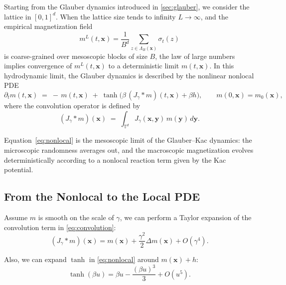 \documentclass[11pt,a4paper]{article}
\begin{document}
Starting from the Glauber dynamics introduced in \cref{sec:glauber}, we consider the lattice in $[0,1]^d$. When the lattice size tends to infinity $L\to\infty$, and the empirical magnetization field
\begin{equation}
    m^L(t,\mathbf{x}) = \frac{1}{B^d}\sum_{z\in \Lambda_B(\mathbf{x})} \sigma_t(z)
\end{equation}
is coarse-grained over mesoscopic blocks of size $B$, the law of large numbers implies convergence of $m^L(t,\mathbf{x})$ to a deterministic limit $m(t,\mathbf{x})$. 
In this hydrodynamic limit, the Glauber dynamics is described by the nonlinear nonlocal PDE
\begin{equation}\label{eq:nonlocal}
    \partial_t m(t,\mathbf{x}) \;=\; -\,m(t,\mathbf{x})\;+\;\tanh\!\Big(\beta\, (J_\gamma * m)(t,\mathbf{x}) + \beta h\Big), 
    \qquad m(0,\mathbf{x})=m_0(\mathbf{x}),
\end{equation}
where the convolution operator is defined by
\begin{equation}
    \label{eq:convolution}
    (J_\gamma * m)(\mathbf{x}) \;=\; \int_{\mathbb{T}^d} J_\gamma(\mathbf{x},\mathbf{y})\,m(\mathbf{y})\,d\mathbf{y}.
\end{equation}

Equation~\eqref{eq:nonlocal} is the mesoscopic limit of the Glauber--Kac dynamics: 
the microscopic randomness averages out, and the macroscopic magnetization evolves deterministically according to a nonlocal reaction term given by the Kac potential.

\subsection{From the Nonlocal to the Local PDE}
Assume $m$ is smooth on the scale of $\gamma$, we can perform a Taylor expansion of the convolution term in \cref{eq:convolution}:
\begin{equation}
    (J_\gamma * m)(\mathbf{x}) = m(\mathbf{x}) + \frac{\gamma^2}{2}\Delta m(\mathbf{x}) + O(\gamma^4).
\end{equation}

Also, we can expand $\tanh$ in \cref{eq:nonlocal} around $m(\mathbf{x}) + h$:
\begin{equation}
    \tanh(\beta u) = \beta u - \frac{(\beta u)^3}{3} + O(u^5).
\end{equation}
\end{document}
